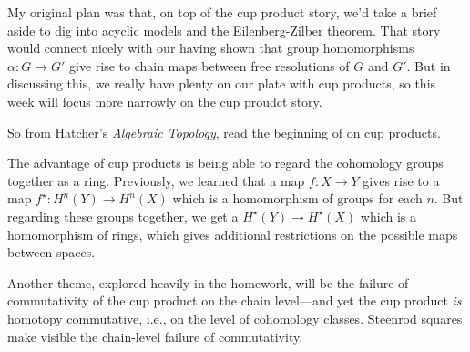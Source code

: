 \documentclass{homework}
\author{Jim Fowler}
\date{Week 6: Products}
\begin{document}
\maketitle

My original plan was that, on top of the cup product story, we'd take
a brief aside to dig into acyclic models and the Eilenberg-Zilber
theorem.  That story would connect nicely with our having shown that
group homomorphisms $\alpha : G \to G'$ give rise to chain maps
between free resolutions of $G$ and $G'$.  But in discussing this, we
really have plenty on our plate with cup products, so this week will
focus more narrowly on the cup proudct story.

So from Hatcher's \textit{Algebraic Topology}, read the beginning of
 on cup products.

The advantage of cup products is being able to regard the cohomology
groups together as a ring.  Previously, we learned that a map $f : X
\to Y$ gives rise to a map $f^\star : H^n(Y) \to H^n(X)$ which is a
homomorphism of groups for each $n$.  But regarding these groups
together, we get a $H^\star(Y) \to H^\star(X)$ which is a homomorphism
of rings, which gives additional restrictions on the possible maps
between spaces.

Another theme, explored heavily in the homework, will be the failure
of commutativity of the cup product on the chain level---and yet the
cup product \textit{is} homotopy commutative, i.e., on the level of
cohomology classes.  Steenrod squares make visible the chain-level
failure of commutativity.
\end{document}
